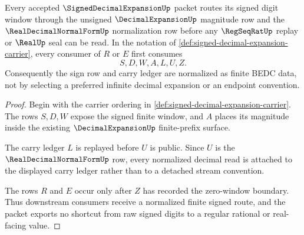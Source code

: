 \begin{theorem}
\label{thm:signed-decimal-expansion-decimal-normalization-route}
Every accepted $\SignedDecimalExpansionUp$ packet routes its signed digit window through the unsigned $\DecimalExpansionUp$ magnitude row and the $\RealDecimalNormalFormUp$ normalization row before any $\RegSeqRatUp$ replay or $\RealUp$ seal can be read. In the notation of \autoref{def:signed-decimal-expansion-carrier}, every consumer of $R$ or $E$ first consumes
$$
S,D,W,A,L,U,Z .
$$
Consequently the sign row and carry ledger are normalized as finite BEDC data, not by selecting a preferred infinite decimal expansion or an endpoint convention.
\end{theorem}
\begin{proof}
Begin with the carrier ordering in \autoref{def:signed-decimal-expansion-carrier}. The rows $S,D,W$ expose the signed finite window, and $A$ places its magnitude inside the existing $\DecimalExpansionUp$ finite-prefix surface.

The carry ledger $L$ is replayed before $U$ is public. Since $U$ is the $\RealDecimalNormalFormUp$ row, every normalized decimal read is attached to the displayed carry ledger rather than to a detached stream convention.

The rows $R$ and $E$ occur only after $Z$ has recorded the zero-window boundary. Thus downstream consumers receive a normalized finite signed route, and the packet exports no shortcut from raw signed digits to a regular rational or real-facing value.
\end{proof}

